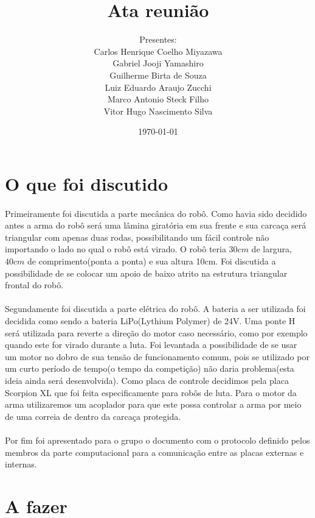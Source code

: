\documentclass{article}
\title{Ata reunião}
\author{
    Presentes:\\
    Carlos Henrique Coelho Miyazawa\\
    Gabriel Jooji Yamashiro\\
    Guilherme Birta de Souza\\
    Luiz Eduardo Araujo Zucchi\\
    Marco Antonio Steck Filho\\
    Vitor Hugo Nascimento Silva
}
\date{\today}
\begin{document}
    \maketitle
    \newpage

    \section{O que foi discutido}
        \paragraph{}
        Primeiramente foi discutida a parte mecânica do robô. Como havia sido decidido antes a arma do robô será uma lâmina giratória em sua frente e sua carcaça será triangular com apenas duas rodas, possibilitando um fácil controle não importando o lado no qual o robô está virado. O robô teria $30cm$ de largura, $40cm$ de comprimento(ponta a ponta) e sua altura 10cm. Foi discutida a possibilidade de se colocar um apoio de baixo atrito na estrutura triangular frontal do robô.

        \paragraph{}
        Segundamente foi discutida a parte elétrica do robô. A bateria a ser utilizada foi decidida como sendo a bateria LiPo(Lythium Polymer) de 24V. Uma ponte H será utilizada para reverte a direção do motor caso necessário, como por exemplo quando este for virado durante a luta. Foi levantada a possibilidade de se usar um motor no dobro de sua tensão de funcionamento comum, pois se utilizado por um curto período de tempo(o tempo da competição) não daria problema(esta ideia ainda será desenvolvida). Como placa de controle decidimos pela placa Scorpion XL que foi feita especificamente para robôs de luta. Para o motor da arma utilizaremos um acoplador para que este possa controlar a arma por meio de uma correia de dentro da carcaça protegida.

        \paragraph{}
        Por fim foi apresentado para o grupo o documento com o protocolo definido pelos membros da parte computacional para a comunicação entre as placas externas e internas.

    \newpage
    \section{A fazer}
\end{document}

